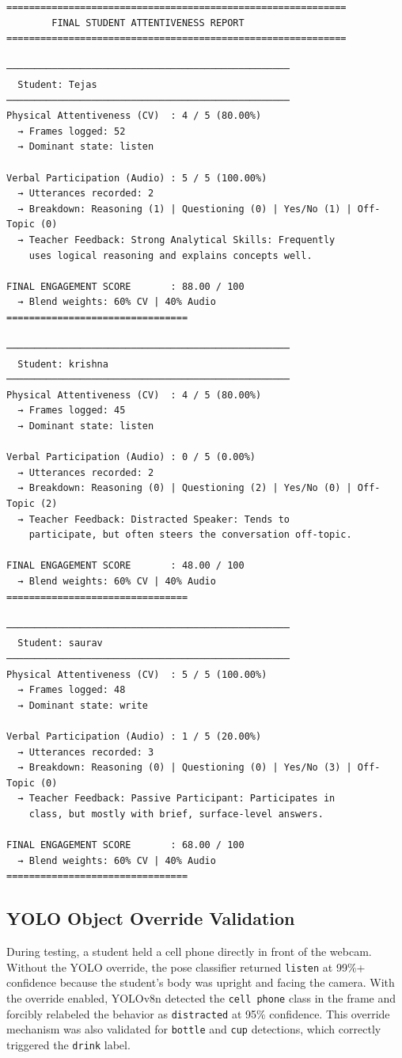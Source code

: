 \documentclass[conference]{IEEEtran}
\begin{document}
\begin{verbatim}
============================================================
        FINAL STUDENT ATTENTIVENESS REPORT
============================================================

──────────────────────────────────────────────────
  Student: Tejas
──────────────────────────────────────────────────
Physical Attentiveness (CV)  : 4 / 5 (80.00%)
  → Frames logged: 52
  → Dominant state: listen

Verbal Participation (Audio) : 5 / 5 (100.00%)
  → Utterances recorded: 2
  → Breakdown: Reasoning (1) | Questioning (0) | Yes/No (1) | Off-Topic (0)
  → Teacher Feedback: Strong Analytical Skills: Frequently 
    uses logical reasoning and explains concepts well.

FINAL ENGAGEMENT SCORE       : 88.00 / 100
  → Blend weights: 60% CV | 40% Audio
================================

──────────────────────────────────────────────────
  Student: krishna
──────────────────────────────────────────────────
Physical Attentiveness (CV)  : 4 / 5 (80.00%)
  → Frames logged: 45
  → Dominant state: listen

Verbal Participation (Audio) : 0 / 5 (0.00%)
  → Utterances recorded: 2
  → Breakdown: Reasoning (0) | Questioning (2) | Yes/No (0) | Off-Topic (2)
  → Teacher Feedback: Distracted Speaker: Tends to 
    participate, but often steers the conversation off-topic.

FINAL ENGAGEMENT SCORE       : 48.00 / 100
  → Blend weights: 60% CV | 40% Audio
================================

──────────────────────────────────────────────────
  Student: saurav
──────────────────────────────────────────────────
Physical Attentiveness (CV)  : 5 / 5 (100.00%)
  → Frames logged: 48
  → Dominant state: write

Verbal Participation (Audio) : 1 / 5 (20.00%)
  → Utterances recorded: 3
  → Breakdown: Reasoning (0) | Questioning (0) | Yes/No (3) | Off-Topic (0)
  → Teacher Feedback: Passive Participant: Participates in 
    class, but mostly with brief, surface-level answers.

FINAL ENGAGEMENT SCORE       : 68.00 / 100
  → Blend weights: 60% CV | 40% Audio
================================
\end{verbatim}

\subsection{YOLO Object Override Validation}
During testing, a student held a cell phone directly in front of the webcam. Without the YOLO override, the pose classifier returned \texttt{listen} at 99\%+ confidence because the student's body was upright and facing the camera. With the override enabled, YOLOv8n detected the \texttt{cell phone} class in the frame and forcibly relabeled the behavior as \texttt{distracted} at 95\% confidence. This override mechanism was also validated for \texttt{bottle} and \texttt{cup} detections, which correctly triggered the \texttt{drink} label.
\end{document}
